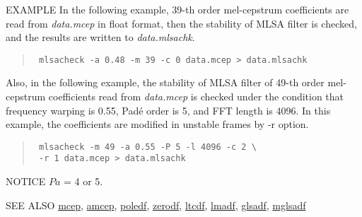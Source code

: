 \begin{qsection}{EXAMPLE}
In the following example,
39-th order mel-cepstrum coefficients are
read from {\em data.mcep} in float format,
then the stability of MLSA filter is checked,
 and the results are written to {\em data.mlsachk}.
\begin{quote}
 \verb! mlsacheck -a 0.48 -m 39 -c 0 data.mcep > data.mlsachk !
\end{quote}
 Also, in the following example, the stability of MLSA filter of 49-th order
 mel-cepstrum coefficients read from {\em data.mcep} is checked
 under the condition that
 frequency warping is 0.55, Pad\'e order is 5, and FFT length is 4096.
 In this example, the coefficients are modified in unstable frames by -r option.
\begin{quote}
 \verb! mlsacheck -m 49 -a 0.55 -P 5 -l 4096 -c 2 \ !\\
 \verb! -r 1 data.mcep > data.mlsachk!
\end{quote}
\end{qsection}

\begin{qsection}{NOTICE}
$Pa$ = 4 or 5. 
\end{qsection}

\begin{qsection}{SEE ALSO}
\hyperlink{mcep}{mcep},
\hyperlink{amcep}{amcep},
\hyperlink{poledf}{poledf},
\hyperlink{zerodf}{zerodf},
\hyperlink{ltcdf}{ltcdf},
\hyperlink{lmadf}{lmadf},
\hyperlink{glsadf}{glsadf},
\hyperlink{mglsadf}{mglsadf}
\end{qsection}
